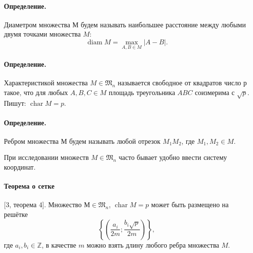 \documentclass[a4paper,openbib]{article}
\begin{document}
\paragraph{Определение.}
Диаметром множества М будем называть наибольшее расстояние между любыми двумя точками множества $M$:
$$
	\operatorname{diam} M=\max_{A, B \in M} |A-B|
	.
$$

\paragraph{Определение.}
Характеристикой множества $M \in \mathfrak{M}_{n}$ называется свободное от квадратов число $р$ такое,
что для любых $A, B, C \in M$ площадь треугольника $ABC$ соизмерима с $\sqrt{p}$.
Пишут: $\operatorname{char}{M}={p}$.

\paragraph{Определение.}
Ребром множества $М$ будем называть любой отрезок $M_{1} M_{2}$, где $M_{1}, M_{2} \in M$.


При исследовании множеств $M\in\mathfrak{M}_n$ часто бывает удобно ввести систему координат.


\paragraph{Теорема о сетке} [3, теорема 4].
Множество $М\in\mathfrak{M}_n$, $\operatorname{char} M = p$ может быть размещено на решётке
$$
	\left\{\left(\frac{a_{i}}{2 m} ; \frac{b_{i} \sqrt{p}}{2 m}\right)\right\}
	,
$$
где $a_{i}, b_{i} \in \mathbb{Z}$, в качестве $m$ можно взять длину любого ребра множества $M$.
\end{document}
